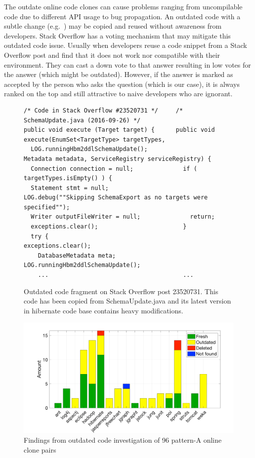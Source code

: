 \documentclass{sig-alternate-05-2015}
\begin{document}
The outdate online code clones can cause problems ranging from uncompilable code due to different API usage to bug propagation. An outdated code with a subtle change (e.g.~) may be copied and reused without awareness from developers. Stack Overflow has a voting mechanism that may mitigate this outdated code issue. Usually when developers reuse a code snippet from a Stack Overflow post and find that it does not work nor compatible with their environment. They can cast a down vote to that answer resulting in low votes for the answer (which might be outdated). However, if the answer is marked as accepted by the person who asks the question (which is our case), it is always ranked on the top and still attractive to naive developers who are ignorant. 

\begin{figure}
	\begin{lstlisting}
/* Code in Stack Overflow #23520731 */     /* SchemaUpdate.java (2016-09-26) */
public void execute (Target target) {      public void execute(EnumSet<TargetType> targetTypes, 
  LOG.runningHbm2ddlSchemaUpdate();                        Metadata metadata, ServiceRegistry serviceRegistry) {
  Connection connection = null;              if ( targetTypes.isEmpty() ) {
  Statement stmt = null;                       LOG.debug(""Skipping SchemaExport as no targets were specified"");
  Writer outputFileWriter = null;              return;
  exceptions.clear();                        }
  try {                                      exceptions.clear();
    DatabaseMetadata meta;                   LOG.runningHbm2ddlSchemaUpdate();
    ...                                      ...
	\end{lstlisting}
	\caption{Outdated code fragment on Stack Overflow post 23520731. This code has been copied from SchemaUpdate.java and its latest version in hibernate code base contains heavy modifications.}
	\label{fig:hibernate_outdated_code}
\end{figure}

\begin{figure}
	\centering
	\includegraphics[width=0.8\linewidth]{outdated}
	\caption{Findings from outdated code investigation of 96 pattern-A online clone pairs}
	\label{fig:outdated}
\end{figure}
\end{document}
